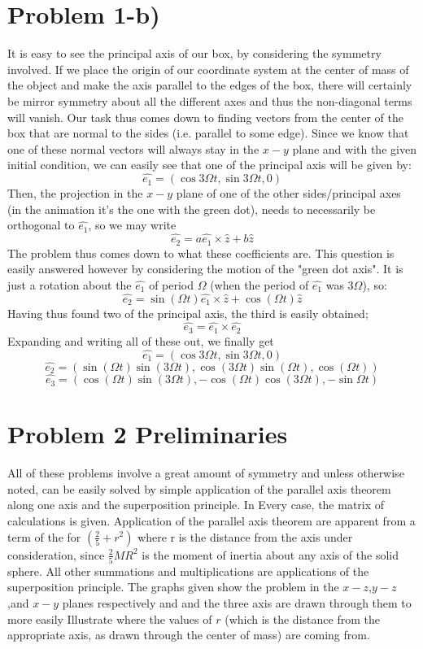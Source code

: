 \section*{Problem 1-b)}
It is easy to see the principal axis of our box, by considering the symmetry involved. If we place the origin of our coordinate system at the center of mass of the object and make the axis parallel to the edges of the box, there will certainly be mirror symmetry about all the different axes and thus the non-diagonal terms will vanish. Our task thus comes down to finding vectors from the center of the box that are normal to the sides (i.e. parallel to some edge). Since we know that one of these normal vectors will always stay in the $x-y$ plane and with the given initial condition, we can easily see that one of the principal axis will be given by:
\[ \hat{e_1} = (\cos 3 \Omega t,\sin 3 \Omega t,0) \]
Then, the projection in the $x-y$ plane of one of the other sides/principal axes (in the animation it's the one with the green dot), needs to necessarily be orthogonal to $\hat{e_1}$, so we may write
\[ \hat{e_2} = a \hat{e_1} \times \hat{z} + b \hat{z} \]
The problem thus comes down to what these coefficients are. This question is easily answered however by considering the motion of the "green dot axis". It is just a rotation about the $\hat{e_1}$ of period $\Omega$ (when the period of $\hat{e_1}$ was $3\Omega$), so:
\[ \hat{e_2} = \sin (\Omega t)  \hat{e_1} \times \hat{z} + \cos(\Omega t) \hat{z} \] Having thus found two of the principal axis, the third is easily obtained;
\[ \hat{e_3} = \hat{e_1} \times \hat{e_2} \]
Expanding and writing all of these out, we finally get
\[ \hat{e_1} = (\cos 3 \Omega t,\sin 3 \Omega t,0)  \]
\[ \hat{e_2} = (\sin(\Omega t) \sin(3 \Omega t), \cos(3 \Omega t) \sin(\Omega t), \cos(\Omega t) ) \]
\[ \hat{e_3} = (\cos(\Omega t) \sin(3 \Omega t), -\cos(\Omega t) \cos (3\Omega t), -\sin\Omega t) \]
\section*{Problem 2 Preliminaries}
All of these problems involve a great amount of symmetry and unless otherwise noted, can be easily solved by simple application of the parallel axis theorem along one axis and the superposition principle. In Every case, the matrix of calculations is given. Application of the parallel axis theorem are apparent from a term of the for $(\frac{2}{5}+r^2)$ where r is the distance from the axis under consideration, since $\frac{2}{5} MR^2$ is the moment of inertia about any axis of the solid sphere. All other summations and multiplications are applications of the superposition principle.  The graphs given show the problem in the $x-z$,$y-z$,and $x-y$ planes respectively and and the three axis are drawn through them to more easily Illustrate where the values of $r$ (which is the distance from the appropriate axis, as drawn through the center of mass) are coming from.
